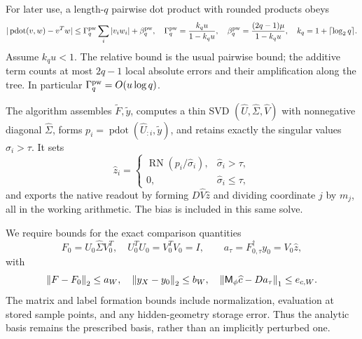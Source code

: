 For later use, a length-$q$ pairwise dot product with rounded products obeys
\begin{equation}
 |\operatorname{pdot}(v,w)-v^Tw|
 \le\Gamma_q^{\rm pw}\sum_i|v_iw_i|+\beta_q^{\rm pw},\quad
 \Gamma_q^{\rm pw}=\frac{k_qu}{1-k_qu},\quad
 \beta_q^{\rm pw}=\frac{(2q-1)\mu}{1-k_qu},\quad
 k_q=1+\lceil\log_2q\rceil.
 \label{eq:pairwise-bound}
\end{equation}
Assume $k_qu<1$. The relative bound is the usual pairwise bound; the additive
term counts at most $2q-1$ local absolute errors and their amplification
along the tree. In particular $\Gamma_q^{\rm pw}=O(u\log q)$.

The algorithm assembles $\widetilde F,\widetilde y$, computes a thin SVD
$(\widehat U,\widehat\Sigma,\widehat V)$ with nonnegative diagonal
$\widehat\Sigma$, forms $p_i=\operatorname{pdot}(\widehat U_{:i},\widetilde y)$,
and retains exactly the singular values $\widehat\sigma_i>\tau$. It sets
\begin{equation}
 \widehat z_i=\begin{cases}
 \operatorname{RN}(p_i/\widehat\sigma_i),&\widehat\sigma_i>\tau,\\
 0,&\widehat\sigma_i\le\tau,
 \end{cases}
 \label{eq:computed-svd-coordinates}
\end{equation}
and exports the native readout by forming
$D\widehat V\widehat z$ and dividing coordinate $j$ by $m_j$, all in the
working arithmetic. The bias is included in this same solve.

We require bounds for the exact comparison quantities
\begin{equation}
 F_0=U_0\widehat\Sigma V_0^T,\quad U_0^TU_0=V_0^TV_0=I,
 \qquad
 a_\tau=F_{0,\tau}^{\dagger}y_0=V_0\widehat z,
 \label{eq:comparison-objects}
\end{equation}
with
\begin{equation}
 \left\lVert F-F_0\right\rVert_2\le a_W,\quad \left\lVert y_X-y_0\right\rVert_2\le b_W,\quad
 \left\lVert \mathsf M_\phi\widehat c-Da_\tau\right\rVert_1\le e_{c,W}.
 \label{eq:nearby-problem}
\end{equation}
The matrix and label formation bounds include normalization, evaluation at
stored sample points, and any hidden-geometry storage error. Thus the analytic
basis remains the prescribed basis, rather than an implicitly perturbed one.

